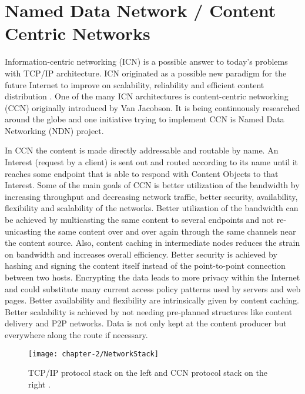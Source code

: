 \section{Named Data Network / Content Centric Networks}

Information-centric networking (ICN) is a possible answer to today's problems with TCP/IP architecture. ICN originated as a possible new paradigm for the future Internet to improve on scalability, reliability and efficient content distribution \cite{jacobson09, ndn17}. One of the many ICN architectures is content-centric networking (CCN) originally introduced by Van Jacobson. It is being continuously researched around the globe and one initiative trying to implement CCN is Named Data Networking (NDN) project.

\vspace{5mm} %

In CCN the content is made directly addressable and routable by name. An Interest (request by a client) is sent out and routed according to its name until it reaches some endpoint that is able to respond with Content Objects to that Interest. Some of the main goals of CCN is better utilization of the bandwidth by increasing throughput and decreasing network traffic, better security, availability, flexibility and scalability of the networks. Better utilization of the bandwidth can be achieved by multicasting the same content to several endpoints and not re-unicasting the same content over and over again through the same channels near the content source. Also, content caching in intermediate nodes reduces the strain on bandwidth and increases overall efficiency. Better security is achieved by hashing and signing the content itself instead of the point-to-point connection between two hosts. Encrypting the data leads to more privacy within the Internet and could substitute many current access policy patterns used by servers and web pages. Better availability and flexibility are intrinsically given by content caching. Better scalability is achieved by not needing pre-planned structures like content delivery and P2P networks. Data is not only kept at the content producer but everywhere along the route if necessary.

\vspace{5mm} %

\begin{figure}[H]
  \centering
  \texttt{[image: chapter-2/NetworkStack]}
  \caption{TCP/IP protocol stack on the left and CCN protocol stack on the right \cite{jacobson09}.}
  \label{fig:NetworkStack}
\end{figure}

